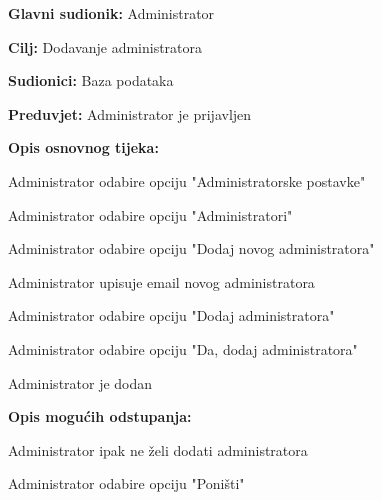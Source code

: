 					\noindent {}
					\begin{packed_item}
	
						\item \textbf{Glavni sudionik:} Administrator
						\item  \textbf{Cilj:} Dodavanje administratora
						\item  \textbf{Sudionici:} Baza podataka
						\item  \textbf{Preduvjet:} Administrator je prijavljen
						\item  \textbf{Opis osnovnog tijeka:}
						
						\item[] \begin{packed_enum}
	
							\item Administrator odabire opciju "Administratorske postavke"
							\item Administrator odabire opciju "Administratori"
							\item Administrator odabire opciju "Dodaj novog administratora"
							\item Administrator upisuje email novog administratora
							\item Administrator odabire opciju "Dodaj administratora"
							\item Administrator odabire opciju "Da, dodaj administratora"
							\item Administrator je dodan
						\end{packed_enum}
						
						\item  \textbf{Opis mogućih odstupanja:}
						
						\item[] \begin{packed_item}
	
							\item[6.a] Administrator ipak ne želi dodati administratora
							\item[] \begin{packed_enum}
								
								\item Administrator odabire opciju "Poništi"
								
							\end{packed_enum}
						\end{packed_item}
					\end{packed_item}

